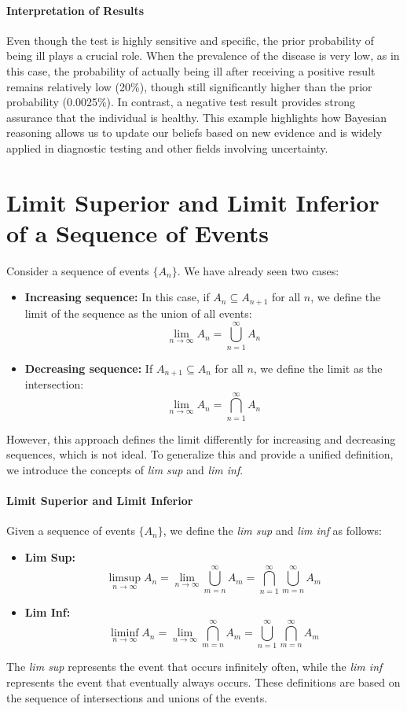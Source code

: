     \paragraph{Interpretation of Results}
    Even though the test is highly sensitive and specific, the prior probability of being ill plays a crucial role. When the prevalence of the disease is very low, as in this case, the probability of actually being ill after receiving a positive result remains relatively low (20\%), though still significantly higher than the prior probability (0.0025\%). \newline
    In contrast, a negative test result provides strong assurance that the individual is healthy. This example highlights how Bayesian reasoning allows us to update our beliefs based on new evidence and is widely applied in diagnostic testing and other fields involving uncertainty.
    
    \section{Limit Superior and Limit Inferior of a Sequence of Events}
    Consider a sequence of events \( \{A_n\} \). We have already seen two cases:
    \begin{itemize}
        \item \textbf{Increasing sequence:} In this case, if \( A_n \subseteq A_{n+1} \) for all \( n \), we define the limit of the sequence as the union of all events:
        \[
        \lim_{n \to \infty} A_n = \bigcup_{n=1}^{\infty} A_n
        \]
        \item \textbf{Decreasing sequence:} If \( A_{n+1} \subseteq A_n \) for all \( n \), we define the limit as the intersection:
        \[
        \lim_{n \to \infty} A_n = \bigcap_{n=1}^{\infty} A_n
        \]
    \end{itemize}
    However, this approach defines the limit differently for increasing and decreasing sequences, which is not ideal. To generalize this and provide a unified definition, we introduce the concepts of \emph{lim sup} and \emph{lim inf}.
    
    \paragraph{Limit Superior and Limit Inferior}
    Given a sequence of events \( \{A_n\} \), we define the \emph{lim sup} and \emph{lim inf} as follows:
    \begin{itemize}
        \item \textbf{Lim Sup:}
        \[
        \limsup_{n \to \infty} A_n = \lim_{n \to \infty} \bigcup_{m=n}^{\infty} A_m=\bigcap_{n=1}^{\infty} \bigcup_{m=n}^{\infty} A_m
        \]
        \item \textbf{Lim Inf:}
        \[
        \liminf_{n \to \infty} A_n = \lim_{n \to \infty} \bigcap_{m=n}^{\infty} A_m= \bigcup_{n=1}^{\infty} \bigcap_{m=n}^{\infty} A_m
        \]
    \end{itemize}
    The \emph{lim sup} represents the event that occurs infinitely often, while the \emph{lim inf} represents the event that eventually always occurs. These definitions are based on the sequence of intersections and unions of the events.
    

